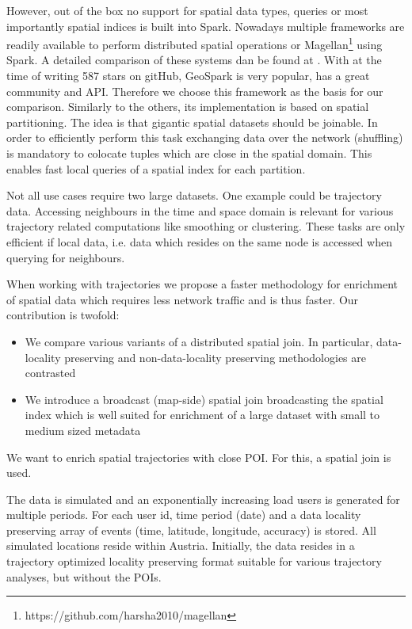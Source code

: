 \documentclass[conference]{IEEEtran}
\begin{document}
However, out of the box no support for spatial data types, queries or most importantly spatial indices is built into Spark.
Nowadays multiple frameworks are readily available to perform distributed spatial operations \cite{Tangy2015, Yu2017, Xie2016, Yu2019} or Magellan\footnote{https://github.com/harsha2010/magellan} using Spark.
A detailed comparison of these systems dan be found at \cite{Yu2019, Garcia-Garcia2017}.
With at the time of writing 587 stars on gitHub, GeoSpark \cite{Yu2015} is very popular, has a great community and API.
Therefore we choose this framework as the basis for our comparison.
Similarly to the others, its implementation is based on spatial partitioning.
The idea is that gigantic spatial datasets should be joinable.
In order to efficiently perform this task exchanging data over the network (shuffling) is mandatory to colocate tuples which are close in the spatial domain.
This enables fast local queries of a spatial index for each partition.

Not all use cases require two large datasets. One example could be trajectory data.
Accessing neighbours in the time and space domain is relevant for various trajectory related computations like smoothing or clustering.
These tasks are only efficient if local data, i.e. data which resides on the same node is accessed when querying for neighbours.

When working with trajectories we propose a faster methodology for enrichment of spatial data which requires less network traffic and is thus faster. Our contribution is twofold:
\begin{itemize}
  \item We compare various variants of a distributed spatial join. In particular, data-locality preserving and non-data-locality preserving methodologies are contrasted
  \item We introduce a broadcast (map-side) spatial join broadcasting the spatial index which is well suited for enrichment of a large dataset with small to medium sized metadata
\end{itemize}


We want to enrich spatial trajectories with close POI. For this, a spatial join is used.

The data is simulated and an exponentially increasing load users is generated for multiple periods.
For each user id, time period (date) and a data locality preserving array of events (time, latitude, longitude, accuracy) is stored.
All simulated locations reside within Austria.
Initially, the data resides in a trajectory optimized locality preserving format suitable for various trajectory analyses, but without the POIs.
\end{document}
